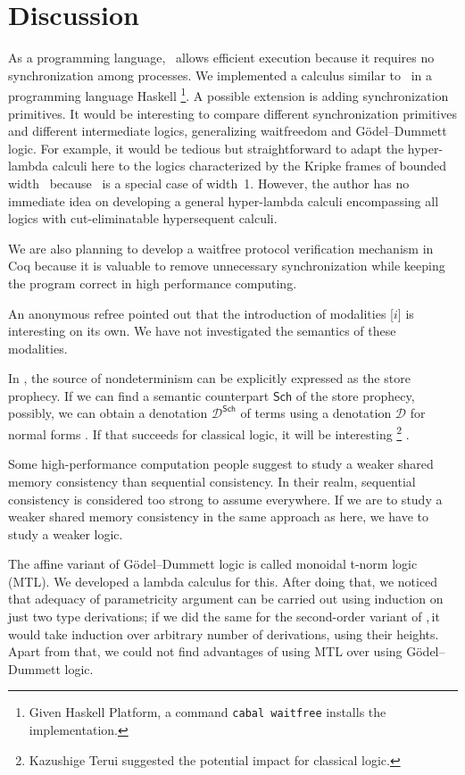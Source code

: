 {\section{Discussion}
\label{future}

As a programming language, \lgd\, allows efficient execution because it
requires no synchronization among processes.
We implemented a calculus similar to \lgd\, in a programming language
Haskell%
\footnote{Given Haskell Platform, a command \texttt{cabal
waitfree} installs the implementation.}.
A possible extension is adding synchronization primitives.
It would be interesting to compare different synchronization primitives
and different intermediate logics, generalizing waitfreedom and
G\"odel--Dummett logic.
For example, it would be tedious but straightforward to adapt the
hyper-lambda calculi here to
the logics characterized by the Kripke frames of bounded
width~\citep{Ciabattoni01042001} because \lgd\, is a special case of
width~1.  However, the author has no immediate idea on
developing a general hyper-lambda calculi encompassing
all logics with cut-eliminatable hypersequent calculi.

We are also planning to develop a waitfree protocol verification mechanism in Coq
because it is valuable to
remove unnecessary synchronization while keeping the program correct
in high performance computing.

An anonymous refree pointed out that the introduction of
modalities [$i$] is interesting on its own.
We have not investigated the semantics of these modalities.


In \lgd, the source of nondeterminism can be explicitly expressed as the
store prophecy.
If we can find a semantic counterpart $\mathsf{Sch}$ of the store
prophecy, possibly, we
can obtain a denotation $\mathcal{D}^\mathsf{Sch}$ of terms
using a denotation $\mathcal{D}$ for normal forms%
.
If that succeeds for classical logic, it will be interesting%
\footnote{Kazushige Terui suggested the potential impact for classical logic.}%
.

Some high-performance computation people suggest to study a weaker
shared memory consistency than sequential consistency.
In their realm, sequential consistency is considered too strong to
assume everywhere.  If we are to study a weaker shared memory
consistency in the same approach as here,
we have to study a weaker logic.

The affine variant of G\"odel--Dummett logic is called
monoidal t-norm logic (MTL).  We developed a lambda calculus for this.
After doing that, we noticed that adequacy of parametricity argument
can be carried out using induction on just two type derivations;
if we did the same for the second-order variant of \lgd,\,it would take
induction over arbitrary number of derivations, using their heights.
Apart from that, we could not find advantages of using MTL over
using G\"odel--Dummett logic.

}
